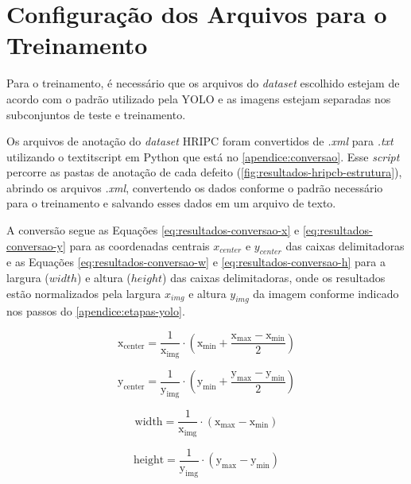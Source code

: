 \section{Configuração dos Arquivos para o Treinamento} \label{cap:treinamento-treinamento-config}

Para o treinamento, é necessário que os arquivos do \textit{dataset} escolhido estejam de acordo com o padrão utilizado pela YOLO e as imagens estejam separadas nos subconjuntos de teste e treinamento.

Os arquivos de anotação do \textit{dataset} HRIPC foram convertidos de \textit{.xml} para \textit{.txt} utilizando o textit{script} em Python que está no \autoref{apendice:conversao}.
Esse \textit{script} percorre as pastas de anotação de cada defeito (\autoref{fig:resultados-hripcb-estrutura}), abrindo os arquivos \textit{.xml}, convertendo os dados conforme o padrão necessário para o treinamento e salvando esses dados em um arquivo de texto.

A conversão segue as Equações \ref{eq:resultados-conversao-x} e \ref{eq:resultados-conversao-y} para as coordenadas centrais $x_{center}$ e $y_{center}$ das caixas delimitadoras e as Equações \ref{eq:resultados-conversao-w} e \ref{eq:resultados-conversao-h} para a largura ($width$) e altura ($height$) das caixas delimitadoras, onde os resultados estão normalizados pela largura $x_{img}$ e altura  $y_{img}$ da imagem conforme indicado nos passos do \autoref{apendice:etapas-yolo}.

\begin{equation} \label{eq:resultados-conversao-x}
\mathrm{
  x_{center} = \frac{1}{x_{img}} \cdot ( x_{min} + \frac{x_{max} - x_{min}}{2})
}
\end{equation}

\begin{equation} \label{eq:resultados-conversao-y}
\mathrm{
  y_{center} = \frac{1}{y_{img}} \cdot ( y_{min} + \frac{y_{max} - y_{min}}{2})
}
\end{equation}

\begin{equation} \label{eq:resultados-conversao-w}
\mathrm{
  width = \frac{1}{x_{img}} \cdot (x_{max} - x_{min})
}
\end{equation}

\begin{equation} \label{eq:resultados-conversao-h}
\mathrm{
  height = \frac{1}{y_{img}} \cdot (y_{max} - y_{min})
}
\end{equation}

